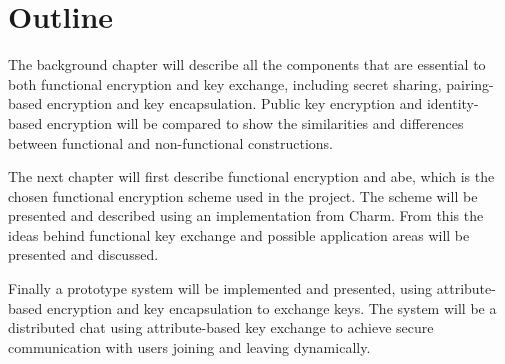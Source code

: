 \section{Outline}\label{sec:outline}
The background chapter will describe all the components that are essential to both functional encryption and key exchange, including secret sharing, pairing-based encryption and key encapsulation. Public key encryption and identity-based encryption will be compared to show the similarities and differences between functional and non-functional constructions. 
\par The next chapter will first describe functional encryption and \gls{abe}, which is the chosen functional encryption scheme used in the project. The scheme will be presented and described using an implementation from Charm. From this the ideas behind functional key exchange and possible application areas will be presented and discussed.
\par Finally a prototype system will be implemented and presented, using attribute-based encryption and key encapsulation to exchange keys. The system will be a distributed chat using attribute-based key exchange to achieve secure communication with users joining and leaving dynamically.

